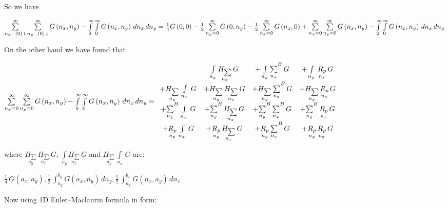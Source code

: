 \documentclass[11pt]{article}
\begin{document}
    So we have

\(\sum\limits_{n_x=\left(0\right)\,1}^{\infty} \sum\limits_{n_y=\left(0\right)\,1}^{\infty} G\left(n_x, n_y\right) - \int\limits_{0}^{\infty} \int\limits_{0}^{\infty} G\left(n_x, n_y\right)\,d{n_x}\,d{n_y} = \\ \frac{1}{4}G\left(0, 0\right) -\frac{1}{2}\sum\limits_{n_y=0}^{\infty}{G\left(0, n_y\right)} -\frac{1}{2}\sum\limits_{n_x=0}^{\infty}{G\left(n_x, 0\right)} +\sum\limits_{n_x=0}^{\infty}\sum\limits_{n_y=0}^{\infty}{G\left(n_x, n_y\right)} - \int\limits_{0}^{\infty} \int\limits_{0}^{\infty} G\left(n_x, n_y\right)\,d{n_x}\,d{n_y}\)

    On the other hand we have found that

\(\sum\limits_{n_x=0}^{\infty} \sum\limits_{n_y=0}^{\infty} G\left(n_x, n_y\right) -\int\limits_{0}^{\infty} \int\limits_{0}^{\infty} G\left(n_x, n_y\right)\,d{n_x}\,d{n_y} = \\ \begin{array}{cccc}  \, &  \int\limits_{n_y}^{} \underset{n_x}{H_{\sum}}\,G &  + \int\limits_{n_y}^{}{\sum\limits_{n_x}^{}}^{B}\,G &  + \int\limits_{n_y}^{}\,\underset{n_x}{R_{p}}\,G \\  +\underset{n_y}{H_{\sum}}\,\int\limits_{n_x}^{}\,G &  + \underset{n_y}{H_{\sum}}\,\underset{n_x}{H_{\sum}}\,G &  + \underset{n_y}{H_{\sum}}\,{\sum\limits_{n_x}^{}}^{B}\,G &  + \underset{n_y}{H_{\sum}}\,\underset{n_x}{R_{p}}\,G \\  + {\sum\limits_{n_y}^{}}^{B}\,\int\limits_{n_x}^{}\,G &  + {\sum\limits_{n_y}^{}}^{B}\,\underset{n_x}{H_{\sum}}\,G &  + {\sum\limits_{n_y}^{}}^{B}\,{\sum\limits_{n_x}^{}}^{B}\,G &  + {\sum\limits_{n_y}^{}}^{B}\,\underset{n_x}{R_{p}}\,G \\  + \underset{n_y}{R_{p}}\,\int\limits_{n_x}^{}\,G &  + \underset{n_y}{R_{p}}\,\underset{n_x}{H_{\sum}}\,G &  + \underset{n_y}{R_{p}}\,{\sum\limits_{n_x}^{}}^{B}\,G &  + \underset{n_y}{R_{p}}\,\underset{n_x}{R_{p}}\,G \end{array}\)

    where \(\underset{n_y}{H_{\sum}}\,\underset{n_x}{H_{\sum}}\,G\),
\(\int\limits_{n_y}^{} \underset{n_x}{H_{\sum}}\,G\) and
\(\underset{n_y}{H_{\sum}}\,\int\limits_{n_x}^{}\,G\) are:

    \(\frac{1}{4} \, G\left(a_{x}, a_{y}\right) , \frac{1}{2} \, \int_{a_{y}}^{b_{y}} G\left(a_{x}, n_{y}\right)\,{d n_{y}} , \frac{1}{2} \, \int_{a_{x}}^{b_{x}} G\left(n_{x}, a_{y}\right)\,{d n_{x}}\)

    Now using 1D Euler--Maclaurin formula in form:
\end{document}
